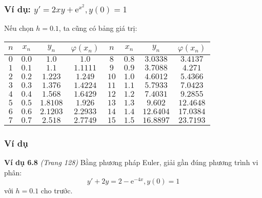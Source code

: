 \begin{frame}
	\frametitle{Ví dụ: $y'=2xy+\mathrm{e}^{x^2},y(0)=1$}
	Nếu chọn $h=0.1$, ta cũng có bảng giá trị:
	\begin{table}\begin{tabular}{|c|c|c|c||c|c|c|c|}\hline
		$n$ & $x_n$ & $y_n$    & $\varphi(x_n)$ & $n$  & $x_n$ & $y_n$     & $\varphi(x_n)$ \\\hline
		$0$ & $0.0$  & $1.0$   & $1.0$          & $8$  & $0.8$ & $3.0338$  & $3.4137$       \\\hline
		$1$ & $0.1$ & $1.1$    & $1.1111$       & $9$  & $0.9$ & $3.7088$  & $4.271$        \\\hline
		$2$ & $0.2$ & $1.223$  & $1.249$        & $10$ & $1.0$ & $4.6012$  & $5.4366$       \\\hline
		$3$ & $0.3$ & $1.376$  & $1.4224$       & $11$ & $1.1$ & $5.7933$  & $7.0423$       \\\hline
		$4$ & $0.4$ & $1.568$  & $1.6429$       & $12$ & $1.2$ & $7.4031$  & $9.2855$       \\\hline
		$5$ & $0.5$ & $1.8108$ & $1.926$        & $13$ & $1.3$ & $9.602$   & $12.4648$      \\\hline
		$6$ & $0.6$ & $2.1203$ & $2.2933$       & $14$ & $1.4$ & $12.6404$ & $17.0384$      \\\hline
		$7$ & $0.7$ & $2.518$  & $2.7749$       & $15$ & $1.5$ & $16.8897$ & $23.7193$      \\\hline
	\end{tabular}\end{table}
\end{frame}
\begin{frame}
	\frametitle{Ví dụ}
	\textbf{Ví dụ 6.8} \textit{(Trang 128)} Bằng phương pháp Euler, giải gần đúng phương trình vi phân:
	$$y'+2y=2-{\mathrm{e}^{-4x}},y(0)=1$$
	với $h=0.1$ cho trước.\par
\end{frame}
